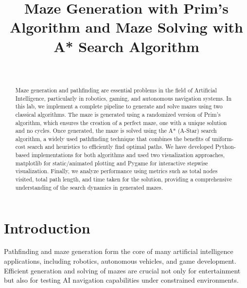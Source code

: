 \documentclass[a4paper, journal]{IEEEtran}
\begin{document}
\title{Maze Generation with Prim's Algorithm and Maze Solving with A* Search Algorithm}
\author{
     \\
    }

\maketitle




\begin{abstract}
    Maze generation and pathfinding are essential problems in the field of Artificial Intelligence, particularly in robotics, gaming, and autonomous navigation systems. In this lab, we implement a complete pipeline to generate and solve mazes using two classical algorithms. The maze is generated using a randomized version of Prim’s algorithm, which ensures the creation of a perfect maze, one with a unique solution and no cycles. Once generated, the maze is solved using the A* (A-Star) search algorithm, a widely used pathfinding technique that combines the benefits of uniform-cost search and heuristics to efficiently find optimal paths. We have developed Python-based implementations for both algorithms and used two visualization approaches, matplotlib for static/animated plotting and Pygame for interactive stepwise visualization. Finally, we analyze performance using metrics such as total nodes visited, total path length, and time taken for the solution, providing a comprehensive understanding of the search dynamics in generated mazes.
\end{abstract}

\section{Introduction}
Pathfinding and maze generation form the core of many artificial intelligence applications, including robotics, autonomous vehicles, and game development. Efficient generation and solving of mazes are crucial not only for entertainment but also for testing AI navigation capabilities under constrained environments.
\end{document}
